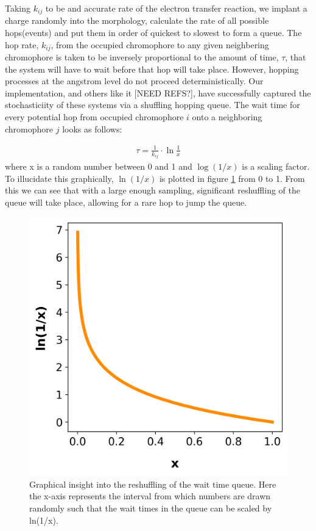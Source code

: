 Taking $k_{ij}$ to be and
accurate rate of the electron transfer reaction, we implant a charge randomly into the morphology, calculate
the rate of all possible hops(events)
and put them in order of quickest to slowest to form a queue. The hop rate, $k_{ij}$, from the occupied chromophore to any
given neighbering chromophore is taken to be
inversely proportional to the amount of time, $\tau$, that the system will have to wait before that hop will
take place. However, hopping processes at the angstrom level do not proceed deterministically. 
Our implementation, and others like it [NEED REFS?], have
successfully captured the stochasticiity of these systems via a shuffling hopping queue.
The wait time for every potential hop from occupied chromophore $i$ onto a
neighboring chromophore $j$ looks as follows:

\begin{align}
    \tau = \frac{1}{k_{ij}} \cdot \ln{\frac{1}{x}} 
\end{align}
where x is a random number between 0 and 1 and $\log{(1/x)}$ is a scaling factor. To illucidate this
graphically, $\ln{(1/x)}$ is plotted in figure \ref{fig:ln} from 0 to 1. From this we can see that with
a large enough sampling, significant reshuffling of the queue will take place, allowing for a rare hop to jump
the queue.

\begin{figure}
  \center
  \includegraphics[width=0.8\linewidth]{figures/naturallog.png}
  \caption{Graphical insight into the reshuffling of the wait time queue. Here the x-axis represents the 
    interval from which numbers are drawn randomly such that the wait times in the queue can be scaled 
    by ln(1/x).}
  \label{fig:ln}
\end{figure}


